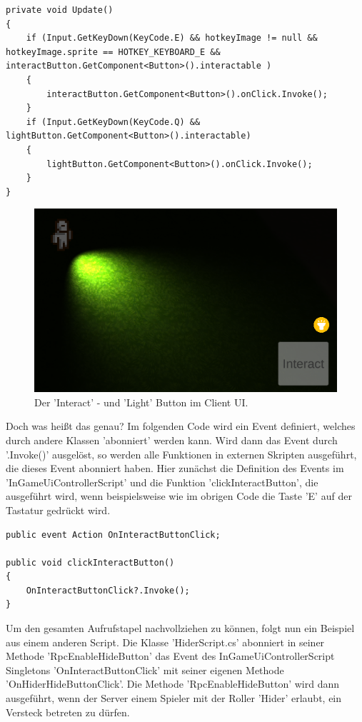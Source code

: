\begin{lstlisting}[caption= InGameUiControllerScript.cs Update Method]
private void Update()
{
	if (Input.GetKeyDown(KeyCode.E) && hotkeyImage != null && hotkeyImage.sprite == HOTKEY_KEYBOARD_E && interactButton.GetComponent<Button>().interactable )
	{
		interactButton.GetComponent<Button>().onClick.Invoke();
	}
	if (Input.GetKeyDown(KeyCode.Q) && lightButton.GetComponent<Button>().interactable)
	{
		lightButton.GetComponent<Button>().onClick.Invoke();
	}
}
\end{lstlisting}

\begin{figure}[H]
	\centering
	\includegraphics[width=120mm]{images/prototyp_interact_light_button.png}
	\caption[Interact and Light Button]{Der 'Interact' - und 'Light' Button im Client UI.}
	\label{pic:prototyp_interact_light_button}
\end{figure}

Doch was heißt das genau? Im folgenden Code wird ein Event definiert, welches durch andere Klassen 'abonniert' werden kann. Wird dann das Event durch '.Invoke()' ausgelöst, so werden alle Funktionen in externen Skripten ausgeführt, die dieses Event abonniert haben. Hier zunächst die Definition des Events im 'InGameUiControllerScript' und die Funktion 'clickInteractButton', die ausgeführt wird, wenn beispielsweise wie im obrigen Code die Taste 'E' auf der Tastatur gedrückt wird.

\begin{lstlisting}[caption= InGameUiControllerScript.cs OnInteractButtonClick Event]
public event Action OnInteractButtonClick;	

public void clickInteractButton()
{
	OnInteractButtonClick?.Invoke();
}
\end{lstlisting}

Um den gesamten Aufrufstapel nachvollziehen zu können, folgt nun ein Beispiel aus einem anderen Script.
Die Klasse 'HiderScript.cs' abonniert in seiner Methode 'RpcEnableHideButton' das Event des InGameUiControllerScript Singletons 'OnInteractButtonClick' mit seiner eigenen Methode 'OnHiderHideButtonClick'. Die Methode 'RpcEnableHideButton' wird dann ausgeführt, wenn der Server einem Spieler mit der Roller 'Hider' erlaubt, ein Versteck betreten zu dürfen.

